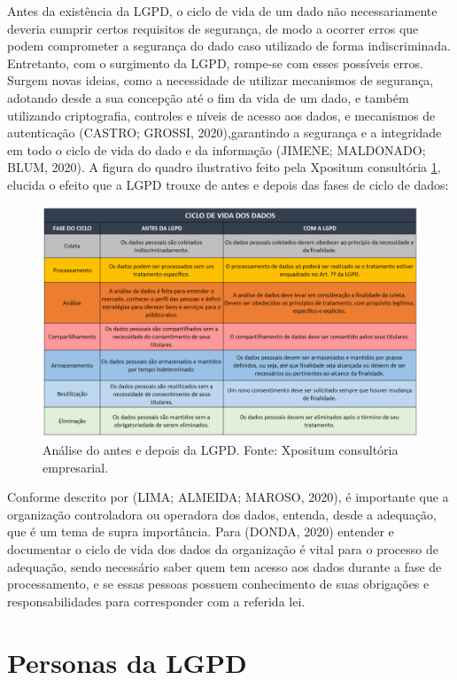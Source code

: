 \documentclass[
	12pt,				%
	openright,			%
	oneside,			%
	a4paper,			%
	english,			%
	french,				%
	spanish,			%
	brazil,				%
	]{abntex2}
\begin{document}
Antes da existência da LGPD, o ciclo de vida de um dado não necessariamente deveria cumprir certos requisitos de segurança, de modo a ocorrer erros que podem comprometer a segurança do dado caso utilizado de forma indiscriminada. Entretanto, com o surgimento da LGPD, rompe-se com esses possíveis erros. Surgem novas ideias, como a necessidade de utilizar mecanismos de segurança, adotando desde a sua concepção até o fim da vida de um dado, e também utilizando criptografia, controles e níveis de acesso aos dados, e mecanismos de autenticação (CASTRO; GROSSI, 2020),garantindo a segurança e a integridade em todo o ciclo de vida do dado e da informação (JIMENE; MALDONADO; BLUM, 2020).
A figura do quadro ilustrativo feito pela Xpositum consultória \ref{fig: 02CicloDeVida}, elucida o efeito que a LGPD trouxe de antes e depois das fases de ciclo de dados:
\begin{figure}[ht]
    \centering
    \includegraphics[width=6.3in]{Images/02CicloDeVida.png}
    \caption{Análise do antes e depois da LGPD. Fonte: Xpositum consultória empresarial.}
    \label{fig: 02CicloDeVida}
\end{figure}

Conforme descrito por (LIMA; ALMEIDA; MAROSO, 2020), é importante que a organização controladora ou operadora dos dados, entenda, desde a adequação, que é um tema de supra importância. Para (DONDA, 2020) entender e documentar o ciclo de vida dos dados da organização é vital para o processo de adequação, sendo necessário saber quem tem acesso aos dados durante a fase de processamento, e se essas pessoas possuem conhecimento de suas obrigações e responsabilidades para corresponder com a referida lei.

\section{Personas da LGPD}
\label{sec: exemplo2}
\end{document}
